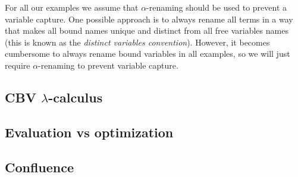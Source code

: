 \documentclass{article}
\newcommand{\lam}{\lambda}
\begin{document}
For all our examples we assume that $\alpha$-renaming should be used to prevent a variable capture. One possible approach is to always rename all terms in a way that makes all bound names unique and distinct from all free variables names (this is known as the \textit{distinct variables convention}). However, it becomes cumbersome to always rename bound variables in all examples, so we will just require $\alpha$-renaming to prevent variable capture.                                          

\subsection{CBV $\lam$-calculus}\label{cbv}

\subsection{Evaluation vs optimization}\label{eval}

\subsection{Confluence}
\end{document}
